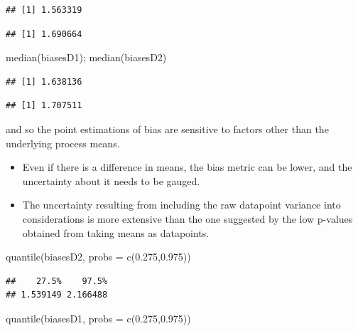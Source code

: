 \documentclass[
  10pt,
  dvipsnames,enabledeprecatedfontcommands]{scrartcl}
\newenvironment{Shaded}{\begin{snugshade}}{\end{snugshade}}
\newcommand{\AttributeTok}[1]{\textcolor[rgb]{0.77,0.63,0.00}{#1}}
\newcommand{\FloatTok}[1]{\textcolor[rgb]{0.00,0.00,0.81}{#1}}
\newcommand{\FunctionTok}[1]{\textcolor[rgb]{0.00,0.00,0.00}{#1}}
\newcommand{\NormalTok}[1]{#1}
\begin{document}
\begin{verbatim}
## [1] 1.563319
\end{verbatim}

\begin{verbatim}
## [1] 1.690664
\end{verbatim}

\begin{Shaded}
\begin{Highlighting}[]
\FunctionTok{median}\NormalTok{(biasesD1); }\FunctionTok{median}\NormalTok{(biasesD2)}
\end{Highlighting}
\end{Shaded}

\begin{verbatim}
## [1] 1.638136
\end{verbatim}

\begin{verbatim}
## [1] 1.707511
\end{verbatim}

\normalsize

and so the point estimations of bias are sensitive to factors other than
the underlying process means.

\begin{itemize}
\item
  Even if there is a difference in means, the bias metric can be lower,
  and the uncertainty about it needs to be gauged.
\item
  The uncertainty resulting from including the raw datapoint variance
  into considerations is more extensive than the one suggested by the
  low p-values obtained from taking means as datapoints.
\end{itemize}

\vspace{1mm}
\footnotesize

\begin{Shaded}
\begin{Highlighting}[]
\FunctionTok{quantile}\NormalTok{(biasesD2, }\AttributeTok{probs =} \FunctionTok{c}\NormalTok{(}\FloatTok{0.275}\NormalTok{,}\FloatTok{0.975}\NormalTok{))}
\end{Highlighting}
\end{Shaded}

\begin{verbatim}
##    27.5%    97.5% 
## 1.539149 2.166488
\end{verbatim}

\begin{Shaded}
\begin{Highlighting}[]
\FunctionTok{quantile}\NormalTok{(biasesD1, }\AttributeTok{probs =} \FunctionTok{c}\NormalTok{(}\FloatTok{0.275}\NormalTok{,}\FloatTok{0.975}\NormalTok{))}
\end{Highlighting}
\end{Shaded}
\end{document}

